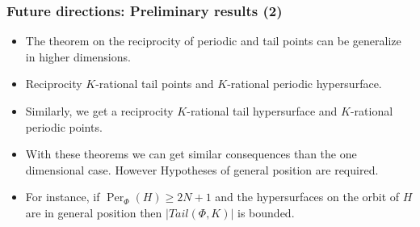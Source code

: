 \documentclass{beamer}
\DeclareMathOperator{\Per}{Per}
\theoremstyle{thmstyle}
\theoremstyle{mystyle}
\theoremstyle{qstnstyle}
\begin{document}
\begin{frame}
\frametitle{Future directions: Preliminary results (2)}

\begin{itemize}
\item The theorem on the reciprocity of periodic and tail points can be generalize in higher dimensions.
 

\item Reciprocity $K$-rational tail points and $K$-rational periodic hypersurface.

 

\item Similarly, we get a reciprocity $K$-rational tail hypersurface and $K$-rational periodic points.

 

\item With these theorems we can get similar consequences than the one dimensional case. However Hypotheses of general position are required. 

 

\item For instance, if $\Per_{\Phi}(H) \geq 2N+1$ and the hypersurfaces on the orbit of $H$ are in general position then $|Tail(\Phi,K)|$ is  bounded.
\end{itemize}


\end{frame}
\end{document}

